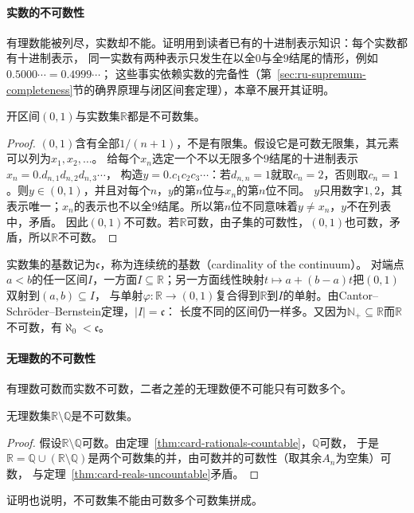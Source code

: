 \paragraph{实数的不可数性}
\label{sec:comb-real-uncountable}
有理数能被列尽，实数却不能。证明用到读者已有的十进制表示知识：每个实数都有十进制表示，
同一实数有两种表示只发生在以全$0$与全$9$结尾的情形，例如$0.5000\cdots=0.4999\cdots$；
这些事实依赖实数的完备性（第~\ref{sec:ru-supremum-completeness}节的确界原理与闭区间套定理），本章不展开其证明。
\begin{theorem}[实数不可数]
\label{thm:card-reals-uncountable}
开区间$(0,1)$与实数集$\mathbb R$都是不可数集。
\end{theorem}
\begin{proof}
$(0,1)$含有全部$1/(n+1)$，不是有限集。假设它是可数无限集，其元素可以列为$x_1,x_2,\ldots$。
给每个$x_n$选定一个不以无限多个$9$结尾的十进制表示$x_n=0.d_{n,1}d_{n,2}d_{n,3}\cdots$，
构造$y=0.c_1c_2c_3\cdots$：若$d_{n,n}=1$就取$c_n=2$，否则取$c_n=1$。则$y\in(0,1)$，并且对每个$n$，$y$的第$n$位与$x_n$的第$n$位不同。
$y$只用数字$1,2$，其表示唯一；$x_n$的表示也不以全$9$结尾。所以第$n$位不同意味着$y\neq x_n$，$y$不在列表中，矛盾。
因此$(0,1)$不可数。若$\mathbb R$可数，由子集的可数性，$(0,1)$也可数，矛盾，所以$\mathbb R$不可数。
\end{proof}

实数集的基数记为$\mathfrak c$，称为连续统的基数（cardinality of the continuum）。
对端点$a<b$的任一区间$I$，一方面$I\subseteq\mathbb R$；另一方面线性映射$t\mapsto a+(b-a)t$把$(0,1)$双射到$(a,b)\subseteq I$，
与单射$\varphi:\mathbb R\to(0,1)$复合得到$\mathbb R$到$I$的单射。由Cantor--Schröder--Bernstein定理，$|I|=\mathfrak c$：
长度不同的区间仍一样多。又因为$\mathbb N_+\subseteq\mathbb R$而$\mathbb R$不可数，有$\aleph_0<\mathfrak c$。

\paragraph{无理数的不可数性}
有理数可数而实数不可数，二者之差的无理数便不可能只有可数多个。
\begin{theorem}[无理数不可数]
\label{thm:card-irrationals-uncountable}
无理数集$\mathbb R\setminus\mathbb Q$是不可数集。
\end{theorem}
\begin{proof}
假设$\mathbb R\setminus\mathbb Q$可数。由定理~\ref{thm:card-rationals-countable}，$\mathbb Q$可数，
于是$\mathbb R=\mathbb Q\cup(\mathbb R\setminus\mathbb Q)$是两个可数集的并，由可数并的可数性（取其余$A_n$为空集）可数，
与定理~\ref{thm:card-reals-uncountable}矛盾。
\end{proof}
证明也说明，不可数集不能由可数多个可数集拼成。

